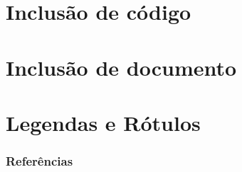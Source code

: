 \documentclass[brazilian]{beamer}
\begin{document}
\section{Inclusão de código}

\section{Inclusão de documento}

\section{Legendas e Rótulos}

\begin{frame}[allowframebreaks]
    \frametitle{Referências}

    \nocite{*}
    \printbibliography[keyword={inserirCodigos}]

\end{frame}
\end{document}
